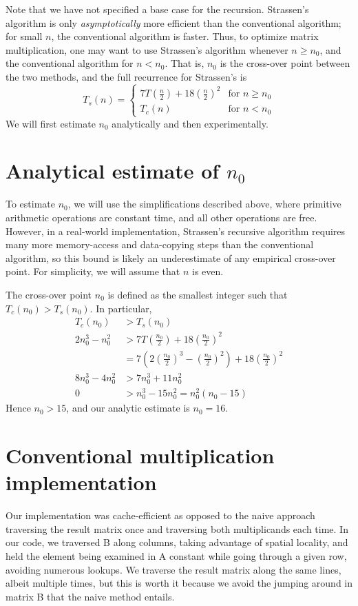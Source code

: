\documentclass[10pt]{article}
\newcommand{\lp}{\left(}
\newcommand{\rp}{\right)}
\begin{document}
Note that we have not specified a base case for the recursion. Strassen's algorithm is only \emph{asymptotically} more efficient than the conventional algorithm; for small $n$, the conventional algorithm is faster. Thus, to optimize matrix multiplication, one may want to use Strassen's algorithm whenever $n \ge n_0$, and the conventional algorithm for $n < n_0$. That is, $n_0$ is the cross-over point between the two methods, and the full recurrence for Strassen's is
\begin{equation}
T_s(n) = 
\begin{cases}
7T\lp \frac{n}{2} \rp + 18\lp \frac{n}{2} \rp ^2 &\text{for $n \ge n_0$}\\
T_c(n) & \text{for $n < n_0$}
\end{cases}
\end{equation}
We will first estimate $n_0$ analytically and then experimentally. 
\\

\section{Analytical estimate of $n_0$}

To estimate $n_0$, we will use the simplifications described above, where primitive arithmetic operations are constant time, and all other operations are free. However, in a real-world implementation, Strassen's recursive algorithm requires many more memory-access and data-copying steps than the conventional algorithm, so this bound is likely an underestimate of any empirical cross-over point. For simplicity, we will assume that $n$ is even.

The cross-over point $n_0$ is defined as the smallest integer such that $T_c(n_0) > T_s(n_0)$. In particular, 
\begin{align*}
T_c(n_0) &> T_s(n_0)\\
2n_0^3 - n_0^2 &> 7T\lp \frac{n_0}{2} \rp + 18\lp \frac{n_0}{2} \rp ^2\\
&= 7\lp2\lp \frac{n_0}{2} \rp^3 - \lp \frac{n_0}{2} \rp^2\rp + 18\lp \frac{n_0}{2} \rp ^2\\
8n_0^3 - 4n_0^2 &> 7n_0^3 + 11 n_0^2 \\
0 &> n_0^3 - 15 n_0^2 = n_0^2(n_0-15)
\end{align*}
Hence $n_0 > 15$, and our analytic estimate is $n_0 = 16$.

\section {Conventional multiplication implementation}
Our implementation was cache-efficient as opposed to the naive approach traversing the result matrix once and traversing both multiplicands each time. In our code, we traversed B along columns, taking advantage of spatial locality, and held the element being examined in A constant while going through a given row, avoiding numerous lookups. We traverse the result matrix along the same lines, albeit multiple times, but this is worth it because we avoid the jumping around in matrix B that the naive method entails. 
\end{document}

